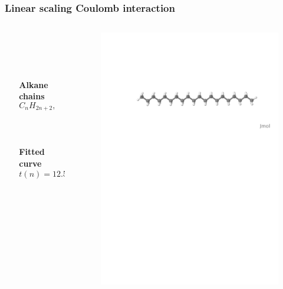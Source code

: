 \begin{frame}
    \frametitle{Linear scaling Coulomb interaction}
    \begin{columns}
    \begin{column}{.10\textwidth}
    \ \\
    \end{column}
    \begin{column}{.40\textwidth}
	\centering
	\ \\
	\ \\
	\ \\
	\ \\
	\textbf{Alkane chains}
	\begin{equation}
	    \nonumber
	    C_{n}H_{2n+2}, \qquad n=2,\dots,70
	\end{equation}
	\ \\
	\ \\
	\ \\
	\textbf{Fitted curve}
	\begin{equation}
	    \nonumber
	    t(n) = 12.5 + 2.34n^{0.754} 
	\end{equation}
    \end{column}
    \begin{column}{.50\textwidth}
	\centering
	\begin{figure}
	    \includegraphics[scale=0.3, clip, viewport = 80 560 600 720]{figures/alkane.pdf}

\end{figure}
\end{column}
\end{columns}
\end{frame}

